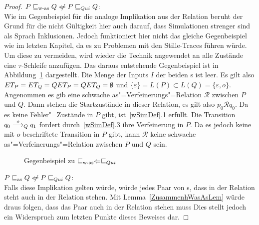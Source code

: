 \begin{proof}
  $P \wasRel Q \hspace{0.1cm}\not\hspace{-0.1cm}\Leftarrow P \QRel Q$:\\
  Wie im Gegenbeispiel für die analoge Implikation aus der Relation \ERel{}
  beruht der Grund für die nicht Gültigkeit hier auch darauf, dass Simulationen
  strenger sind als Sprach Inklusionen. Jedoch funktioniert hier nicht das
  gleiche Gegenbeispiel wie im letzten Kapitel, da es zu Problemen mit den
  Stille-Traces führen würde. Um diese zu vermeiden, wird wieder die Technik
  angewendet an alle Zustände eine $\tau$-Schleife anzufügen. Das daraus
  entstehende Gegenbeispiel ist in Abbildung~\ref{WasQuiGegenBsp} dargestellt.
  Die Menge der Inputs $I$ der beiden \MEIO{}s ist leer. Es gilt also $ET _P =
  ET _Q = QET _P = QET _Q = \emptyset$ und $\{\varepsilon\} = L(P) \subset
  L(Q) = \{\varepsilon , o\}$.\\
  Angenommen es gib eine schwache as"=Verfeinerungs"=Relation $\mathcal{R}$
  zwischen $P$ und $Q$. Dann stehen die Startzustände in dieser Relation, es
  gilt also $p_0 \mathcal{R} q_0$. Da es keine Fehler"=Zustände in $P$ gibt,
  ist~\ref{wSimDef}.1 erfüllt. Die Transition $q_0 \must[o]_Q q_1$ fordert
  durch~\ref{wSimDef}.3 ihre Verfeinerung in $P$. Da es jedoch keine mit $o$
  beschriftete Transition in $P$ gibt, kann $\mathcal{R}$ keine schwache
  as"=Verfeinerungs"=Relation zwischen $P$ und $Q$ sein.

  \begin{figure}[htbp]
    \begin{center}
      \caption{Gegenbeispiel zu $\sqsubseteq _{\mathrm{w}\text{-}\mathrm{as}} \Leftarrow  \sqsubseteq  _{Qui}$}
      \label{WasQuiGegenBsp}
    \end{center}
  \end{figure}

  $P \asRel Q \hspace{0.1cm}\not\hspace{-0.1cm}\Leftarrow P \QRel Q$:\\
  Falls diese Implikation gelten würde, würde jedes Paar von \MEIO{}s, dass in
  der Relation \QRel{} steht auch in der Relation \asRel{} stehen. Mit
  Lemma~\ref{ZusammenhWasAsLem} würde draus folgen, dass das \MEIO{} Paar auch
  in der Relation \wasRel{} stehen muss Dies stellt jedoch ein Widerspruch zum
  letzten Punkte dieses Beweises dar.


\end{proof}
